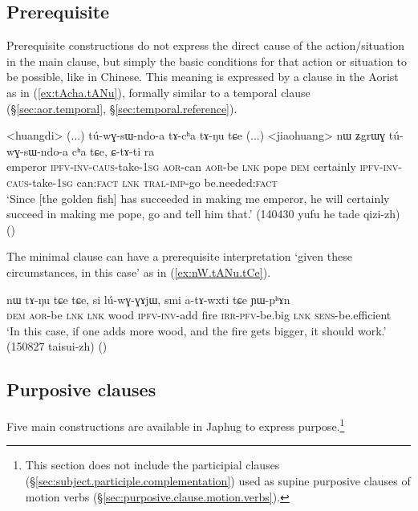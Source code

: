 \subsection{Prerequisite} \label{sec:prerequisite.clause}
Prerequisite constructions do not express the direct cause of the action/situation in the main clause, but simply the basic conditions for that action or situation to be possible, like  in Chinese. This meaning is expressed by a clause in the Aorist as in (\ref{ex:tAcha.tANu}), formally similar to a temporal clause (§\ref{sec:aor.temporal}, §\ref{sec:temporal.reference}).

\begin{exe}
\ex \label{ex:tAcha.tANu}
\gll <huangdi> (...) tú-wɣ-sɯ-ndo-a tɤ-cʰa tɤ-ŋu tɕe (...) <jiaohuang> nɯ ʑgrɯɣ tú-wɣ-sɯ-ndo-a cʰa tɕe, ɕ-tɤ-ti ra \\
emperor {  } \textsc{ipfv}-\textsc{inv}-\textsc{caus}-take-\textsc{1sg} \textsc{aor}-can \textsc{aor}-be \textsc{lnk} {  } pope \textsc{dem} certainly \textsc{ipfv}-\textsc{inv}-\textsc{caus}-take-\textsc{1sg} can:\textsc{fact} \textsc{lnk} \textsc{tral}-\textsc{imp}-go be.needed:\textsc{fact} \\
\glt `Since [the golden fish] has succeeded in making me emperor, he will certainly succeed in making me pope, go and tell him that.' (140430 yufu he tade qizi-zh)
()
\end{exe}

The minimal clause  can have a prerequisite interpretation `given these circumstances, in this case' as in (\ref{ex:nW.tANu.tCe}).

\begin{exe}
\ex \label{ex:nW.tANu.tCe}
\gll nɯ tɤ-ŋu tɕe tɕe, si lú-wɣ-ɣɤjɯ, smi a-tɤ-wxti tɕe ɲɯ-pʰɤn \\
\textsc{dem} \textsc{aor}-be \textsc{lnk} \textsc{lnk} wood \textsc{ipfv}-\textsc{inv}-add fire \textsc{irr}-\textsc{pfv}-be.big \textsc{lnk} \textsc{sens}-be.efficient \\
\glt `In this case, if one adds more wood, and the fire gets bigger, it should work.' (150827 taisui-zh)
()
\end{exe}


 \subsection{Purposive clauses} \label{sec:purposive.clauses}
 Five main constructions are available in Japhug to express purpose.\footnote{This section does not include the  participial clauses (§\ref{sec:subject.participle.complementation}) used as supine purposive clauses of motion verbs  (§\ref{sec:purposive.clause.motion.verbs}).
 }

